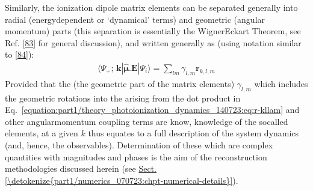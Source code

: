 \documentclass[letterpaper,table,10pt,english]{jupyterBook}
\begin{document}
\sphinxAtStartPar
Similarly, the ionization dipole matrix elements can be separated
generally into radial (energy\sphinxhyphen{}dependent or ‘dynamical’ terms) and
geometric (angular momentum) parts (this separation is essentially the
Wigner\sphinxhyphen{}Eckart Theorem, see Ref. {[}\hyperlink{cite.backmatter/bibliography:id988}{83}{]} for general discussion),
and written generally as (using notation similar to {[}\hyperlink{cite.backmatter/bibliography:id835}{84}{]}):
\begin{equation}\label{equation:part1/theory_photoionization_dynamics_140723:eq:r-kllam}
\begin{split}\langle\Psi_{+};\,\mathbf{k}|\hat{\boldsymbol{\mu}}.\boldsymbol{\mathbf{E}}|\Psi_{i}\rangle = \sum_{lm}\gamma_{l,m}\mathbf{r}_{k,l,m}
\end{split}
\end{equation}
\sphinxAtStartPar
Provided that the {\hyperref[\detokenize{backmatter/glossary:term-geometric-coupling-parameters}]{}} (the geometric part of the matrix elements) \(\gamma_{l,m}\) \sphinxhyphen{}
which includes the geometric rotations into the {\hyperref[\detokenize{backmatter/glossary:term-LF}]{}} arising from the dot
product in Eq. \eqref{equation:part1/theory_photoionization_dynamics_140723:eq:r-kllam} and other angular\sphinxhyphen{}momentum coupling terms \sphinxhyphen{} are
know, knowledge of the so\sphinxhyphen{}called {\hyperref[\detokenize{backmatter/glossary:term-radial-matrix-elements}]{}}
elements, at a given \(k\) thus equates to a full description of the
system dynamics (and, hence, the observables). Determination of these {\hyperref[\detokenize{backmatter/glossary:term-radial-matrix-elements}]{}} \sphinxhyphen{} which are complex quantities with magnitudes and phases \sphinxhyphen{} is the aim of the reconstruction methodologies discussed herein (see \hyperref[\detokenize{part1/numerics_070723:chpt-numerical-details}]{Sect.\@ \ref{\detokenize{part1/numerics_070723:chpt-numerical-details}}}).
\end{document}
